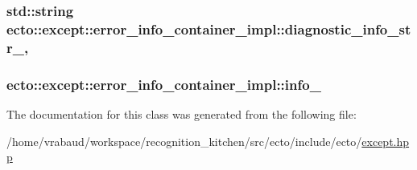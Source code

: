 \subsubsection[{\texorpdfstring{diagnostic\+\_\+info\+\_\+str\+\_\+}{diagnostic_info_str_}}]{\setlength{\rightskip}{0pt plus 5cm}std\+::string ecto\+::except\+::error\+\_\+info\+\_\+container\+\_\+impl\+::diagnostic\+\_\+info\+\_\+str\+\_\+\hspace{0.3cm}{\ttfamily [mutable]}, {\ttfamily [private]}}\hypertarget{classecto_1_1except_1_1error__info__container__impl_aeb86496a5127e19e9f787e77531b1b83}{}\label{classecto_1_1except_1_1error__info__container__impl_aeb86496a5127e19e9f787e77531b1b83}
\subsubsection[{\texorpdfstring{info\+\_\+}{info_}}]{ ecto\+::except\+::error\+\_\+info\+\_\+container\+\_\+impl\+::info\+\_\+\hspace{0.3cm}{\ttfamily [private]}}\hypertarget{classecto_1_1except_1_1error__info__container__impl_a8ec60b174805696bd691a894b7f4109f}{}\label{classecto_1_1except_1_1error__info__container__impl_a8ec60b174805696bd691a894b7f4109f}


The documentation for this class was generated from the following file\+:\begin{DoxyCompactItemize}
\item 
/home/vrabaud/workspace/recognition\+\_\+kitchen/src/ecto/include/ecto/\hyperlink{except_8hpp}{except.\+hpp}\end{DoxyCompactItemize}
